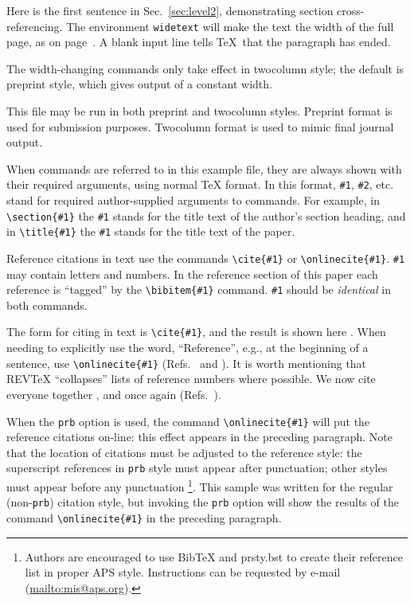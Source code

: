 \documentclass[prb]{revtex4}
\begin{document}
Here is the first sentence in Sec.~\ref{sec:level2}, demonstrating
section cross-referencing.
The environment \texttt{widetext}
will make the text the width of the full page, as on page~\pageref{wideeq}.
A blank input line tells \TeX\ that the paragraph has ended.

The width-changing commands only take effect in twocolumn style; the default
is preprint style, which gives output of a constant width.

This file may be run in both preprint and twocolumn styles. Preprint
format is used for submission purposes. Twocolumn format is used to mimic
final journal output. 

When commands are referred to in this example file, they are always shown
with their required arguments, using normal \TeX{} format. In this format,
\verb+#1+, \verb+#2+, etc. stand for required author-supplied arguments to commands.
For example, in
\verb+\section{#1}+ the \verb+#1+ stands for the title text of the author's section
heading, and in \verb+\title{#1}+ the \verb+#1+ stands for the
title text of the paper.

Reference citations in text use the commands
\verb+\cite{#1}+ or \verb+\onlinecite{#1}+.
\verb+#1+ may contain letters and numbers.
In the reference section of this paper
each reference is ``tagged'' by the \verb+\bibitem{#1}+ command.
\verb+#1+ should be \emph{identical} in both commands.

The form for citing in text is \verb+\cite{#1}+,
and the result is shown here \cite{smith82,jones78}.
When needing to explicitly use the word, ``Reference'', e.g., at the 
beginning of a sentence, use \verb+\onlinecite{#1}+
(Refs.~ and ).
It is worth mentioning that REV\TeX{} ``collapses'' lists
of reference numbers where possible.
We now cite everyone together \cite{smith82,jones78,jonessmith80}, and once again
(Refs.~).

When the {\tt prb} option is used, the command \verb+\onlinecite{#1}+ will
put the reference citations on-line: this effect appears in the preceding paragraph.
Note that the location of citations must be adjusted to the reference style:
the superscript references in {\tt prb} style must appear after punctuation;
other styles must appear before any punctuation%
\footnote{%
 Authors are encouraged to use
 {\rm B{\sc ib}\TeX}\/ and prsty.bst
 to create their reference list in proper APS style.
 Instructions can be requested by e-mail (\protect\url{mailto:mis@aps.org}).
}.
This sample was written
for the regular (non-{\tt prb}) citation style, but invoking the
{\tt prb} option will show the results of  the command \verb+\onlinecite{#1}+
in the preceding paragraph.
\end{document}
